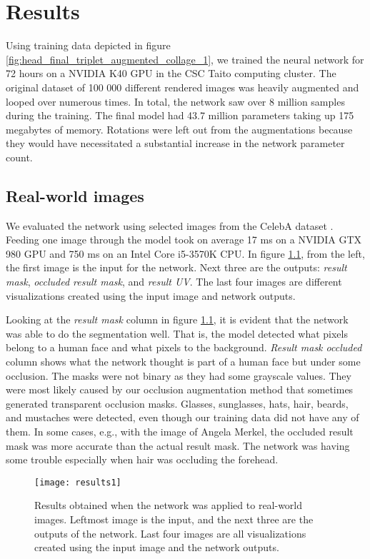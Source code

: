 \chapter{Results}

Using training data depicted in figure \ref{fig:head_final_triplet_augmented_collage_1}, we trained the neural network for 72 hours on a NVIDIA K40 \ac{GPU} in the \ac{CSC} Taito computing cluster. The original dataset of 100 000 different rendered images was heavily augmented and looped over numerous times. In total, the network saw over 8 million samples during the training. The final model had 43.7 million parameters taking up 175 megabytes of memory. Rotations were left out from the augmentations because they would have necessitated a substantial increase in the network parameter count.

\section{Real-world images}

We evaluated the network using selected images from the CelebA dataset \cite{liu2015faceattributes}. Feeding one image through the model took on average 17 ms on a NVIDIA GTX 980 \ac{GPU} and 750 ms on an Intel Core i5-3570K \ac{CPU}. In figure \ref{fig:results_1}, from the left, the first image is the input for the network. Next three are the outputs: \textit{result mask}, \textit{occluded result mask}, and \textit{result UV}. The last four images are different visualizations created using the input image and network outputs.

Looking at the \textit{result mask} column in figure \ref{fig:results_1}, it is evident that the network was able to do the segmentation well. That is, the model detected what pixels belong to a human face and what pixels to the background. \textit{Result mask occluded} column shows what the network thought is part of a human face but under some occlusion. The masks were not binary as they had some grayscale values. They were most likely caused by our occlusion augmentation method that sometimes generated transparent occlusion masks. Glasses, sunglasses, hats, hair, beards, and mustaches were detected, even though our training data did not have any of them. In some cases, e.g., with the image of Angela Merkel, the occluded result mask was more accurate than the actual result mask. The network was having some trouble especially when hair was occluding the forehead.

\begin{figure}[p]
    \texttt{[image: results1]}
    \caption[Real image results]{Results obtained when the network was applied to real-world images. Leftmost image is the input, and the next three are the outputs of the network. Last four images are all visualizations created using the input image and the network outputs.}
    \label{fig:results_1}
\end{figure}

